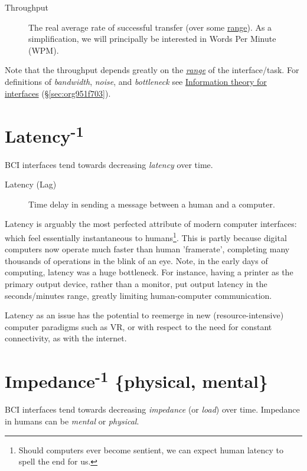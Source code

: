 \documentclass[logo,bsc,singlespacing,parskip]{infthesis}
\begin{document}
\begin{mdframed}
\begin{description}
\item[{Throughput\label{throughput}}] The real average rate of successful transfer (over some  \hyperref[range]{range}). As a simplification, we will principally be interested in Words Per Minute (WPM).
\end{description}
\end{mdframed}

Note that the throughput depends greatly on the \emph{\hyperref[range]{range}} of the interface/task.
For definitions of \emph{bandwidth}, \emph{noise}, and \emph{bottleneck} see \hyperref[sec:org951f703]{Information theory for interfaces} (\S \ref{sec:org951f703}).

\section{Latency\textsuperscript{-1}}
\label{sec:orgb3ab73e}
BCI interfaces tend towards decreasing \emph{latency} over time.

\begin{mdframed}
\begin{description}
\item[{Latency\label{latency} (Lag)}] Time delay in sending a message between a human and a computer.
\end{description}
\end{mdframed}

Latency is arguably the most perfected attribute of modern computer interfaces: which feel essentially instantaneous to humans\footnote{Should computers ever become sentient, we can expect human latency to spell the end for us.}.
This is partly because digital computers now operate much faster than human 'framerate', completing many thousands of operations in the blink of an eye.
Note, in the early days of computing, latency was a huge bottleneck.
For instance, having a printer as the primary output device, rather than a monitor, put output latency in the seconds/minutes range, greatly limiting human-computer communication.

Latency as an issue has the potential to reemerge in new (resource-intensive) computer paradigms such as VR, or with respect to the need for constant connectivity, as with the internet.

\section{Impedance\textsuperscript{-1} \{physical, mental\}}
\label{sec:org50907f7}
BCI interfaces tend towards decreasing \emph{impedance} (or \emph{load}) over time.
Impedance in humans can be \emph{mental} or \emph{physical}.
\end{document}
